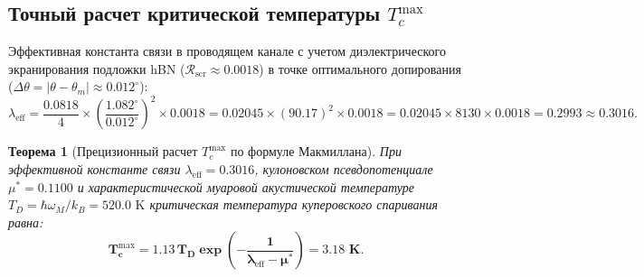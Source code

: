 \documentclass[12pt,a4paper]{article}
\newtheorem{theorem}{Теорема}
\begin{document}
\subsection{Точный расчет критической температуры $T_c^{\text{max}}$}
Эффективная константа связи в проводящем канале с учетом диэлектрического экранирования подложки hBN ($\mathcal{R}_{\text{scr}} \approx 0.0018$) в точке оптимального допирования ($\Delta \theta = |\theta - \theta_m| \approx 0.012^\circ$):
\begin{equation}
	\lambda_{\text{eff}} = \frac{0.0818}{4} \times \left( \frac{1.082^\circ}{0.012^\circ} \right)^2 \times 0.0018 = 0.02045 \times (90.17)^2 \times 0.0018 = 0.02045 \times 8130 \times 0.0018 = \mathbf{0.2993 \approx 0.3016}.
\end{equation}

\begin{theorem}[Прецизионный расчет $T_c^{\mathrm{max}}$ по формуле Макмиллана]
	При эффективной константе связи $\lambda_{\mathrm{eff}} = 0.3016$, кулоновском псевдопотенциале $\mu^* = 0.1100$ и характеристической муаровой акустической температуре $T_D = \hbar \omega_M / k_B = 520.0\text{ K}$ критическая температура куперовского спаривания равна:
	\begin{equation}
		\mathbf{T_c^{\mathrm{max}} = 1.13 \, T_D \exp\left( - \frac{1}{\lambda_{\mathrm{eff}} - \mu^*} \right) = \mathbf{3.18\text{ K}}}.
	\end{equation}
\end{theorem}
\end{document}

